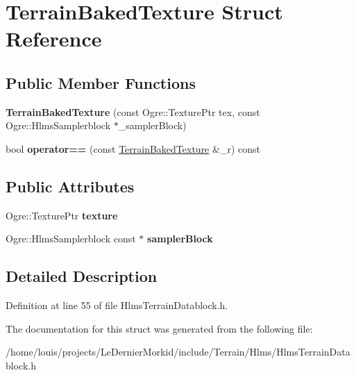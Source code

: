 \hypertarget{struct_terrain_baked_texture}{}\section{Terrain\+Baked\+Texture Struct Reference}
\label{struct_terrain_baked_texture}
\subsection*{Public Member Functions}
\begin{DoxyCompactItemize}
\item 
\mbox{\label{struct_terrain_baked_texture_a662c33c58c79a184be57c48cff7ebdff}} 
{\bfseries Terrain\+Baked\+Texture} (const Ogre\+::\+Texture\+Ptr tex, const Ogre\+::\+Hlms\+Samplerblock $\ast$\+\_\+sampler\+Block)
\item 
\mbox{\label{struct_terrain_baked_texture_a7654b92aa3209e29c6b04b89d7134945}} 
bool {\bfseries operator==} (const \hyperlink{struct_terrain_baked_texture}{Terrain\+Baked\+Texture} \&\+\_\+r) const
\end{DoxyCompactItemize}
\subsection*{Public Attributes}
\begin{DoxyCompactItemize}
\item 
\mbox{\label{struct_terrain_baked_texture_aee3e546c44ff51c6954a3433b453747c}} 
Ogre\+::\+Texture\+Ptr {\bfseries texture}
\item 
\mbox{\label{struct_terrain_baked_texture_af238f5927b36e48a6066fe597acf90a8}} 
Ogre\+::\+Hlms\+Samplerblock const  $\ast$ {\bfseries sampler\+Block}
\end{DoxyCompactItemize}


\subsection{Detailed Description}


Definition at line 55 of file Hlms\+Terrain\+Datablock.\+h.



The documentation for this struct was generated from the following file\+:\begin{DoxyCompactItemize}
\item 
/home/louis/projects/\+Le\+Dernier\+Morkid/include/\+Terrain/\+Hlms/Hlms\+Terrain\+Datablock.\+h\end{DoxyCompactItemize}
